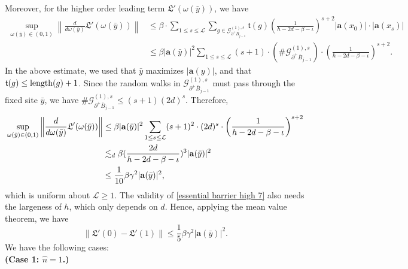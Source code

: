 \documentclass[11pt,reqno,UTF8,twoside]{amsart}
\newcommand{\length}{{\rm length}}
\newcommand{\bfa}{\mathbf{a}}
\newcommand{\mcL}{\mathcal{L}}
\newcommand{\mcG}{\mathcal{G}}
\newcommand{\whn}{\widehat{n}}
\newcommand{\barB}{\overline{B}}
\theoremstyle{definition}
\numberwithin{equation}{section}
\begin{document}
  Moreover, for the higher order leading term $\mathfrak{L}'(\omega(\bar{y}))$, we have 
  \begin{align*}
      \sup_{\omega(\bar{y})\in (0,1)}\left\| \frac{d }{d  \omega(\bar{y})} \mathfrak{L}'(\omega(\bar{y})) \right\| & \leq  \beta \cdot \sum_{1\leq s\leq \mcL}   \sum_{g\in \mcG_{\partial^+ \barB_{j-1}}^{(1),s}} \mathfrak{t}(g) \left(\frac{1}{h-2d-\beta-\iota}\right)^{s+2} |\bfa(x_0)|\cdot |\bfa(x_s)| \\
          & \leq  \beta |\bfa(\bar{y})|^2 \sum_{1\leq s\leq \mcL} (s+1) \cdot \left(\# \mcG_{\partial^+ \barB_{j-1}}^{(1),s} \right) \cdot \left(\frac{1}{h-2d-\beta-\iota}\right)^{s+2}.
  \end{align*}
  In the above estimate, we used that $\bar{y}$ maximizes $|\bfa(y)|$, and that $\mathfrak{t}(g)\leq \length(g)+1$. Since the random walks in $\mcG_{\partial^+ \barB_{j-1}}^{(1),s}$ must pass through the fixed site $\bar{y}$, we have $\# \mcG_{\partial^+ \barB_{j-1}}^{(1),s}\leq (s+1) (2d)^s$. Therefore,
  \begin{align}\label{essential barrier high 7}
     \notag   \sup_{\omega(\bar{y})\in (0,1)}  \left\| \frac{d}{d \omega(\bar{y})} \mathfrak{L}'(\omega(\bar{y})) \right\| & \leq  \beta  |\bfa(\bar{y})|^2 \sum_{1\leq s\leq \mcL} (s+1)^2 \cdot (2d)^s \cdot \left(\frac{1}{h-2d-\beta-\iota}\right)^{s+2} \\
       \notag      & \lesssim_d \beta (\frac{2d}{h-2d-\beta-\iota})^3 |\bfa(\bar{y})|^2 \\
             &\leq \frac{1}{10} \beta \gamma^{2} |\bfa(\bar{y})|^2, 
  \end{align}
 which is  uniform  about $\mcL\geq 1$.
  The validity of \eqref{essential barrier high 7} also needs the largeness of $h$, which  only depends   on $d$. Hence, applying the mean value theorem, we have 
  \begin{equation}\label{hihger order leading term small}
    \| \mathfrak{L}'(0) -\mathfrak{L}'(1)\| \leq \frac{1}{5} \beta \gamma^2 |\bfa(\bar{y})|^2.
  \end{equation}
  We have the following cases: \\

  \noindent \textbf{(Case 1: $\whn=1$.)}\\
\end{document}
